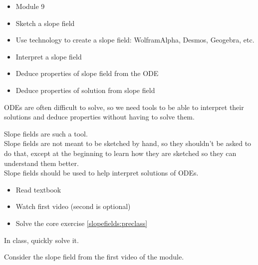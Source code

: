 \begin{lesson}

	\begin{itemize}
		\item Module 9
	\end{itemize}

	\begin{itemize}
		\item Sketch a slope field
		\item Use technology to create a slope field: WolframAlpha, Desmos, Geogebra, etc.
		\item Interpret a slope field
		\item Deduce properties of slope field from the ODE
		\item Deduce properties of solution from slope field
	\end{itemize}
	

ODEs are often difficult to solve, so we need tools to be able to interpret their solutions and deduce properties without having to solve them.

Slope fields are such a tool. \\

Slope fields are not meant to be sketched by hand, so they shouldn't be asked to do that, except at the beginning to learn how they are sketched so they can understand them better. \\

Slope fields should be used to help interpret solutions of ODEs.



\begin{itemize}
	\item Read textbook
	\item Watch first video (second is optional)
	\item Solve the core exercise \ref{slopefields:preclass}
\end{itemize}
 
\end{lesson}








\begin{annotation}
\begin{goals}
	
	In class, quickly solve it.
\end{goals}	
\end{annotation}
\question \label{slopefields:preclass}
	Consider the slope field from the first video of the module.
	
